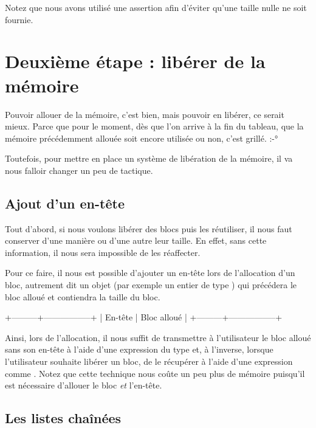 Notez que nous avons utilisé une assertion afin d'éviter qu'une taille
nulle ne soit fournie.

\section{Deuxième étape : libérer de la mémoire}
\label{deuxieme-etape-:-liberer-de-la-memoire}

Pouvoir allouer de la mémoire, c'est bien, mais pouvoir en
libérer, ce serait mieux. Parce que pour le moment, dès que l'on arrive
à la fin du tableau, que la mémoire précédemment allouée soit encore
utilisée ou non, c'est grillé. :-°

Toutefois, pour mettre en place un système de libération de la mémoire,
il va nous falloir changer un peu de tactique.

\subsection{Ajout d'un en-tête}
\label{ajout-dun-en-tete}

Tout d'abord, si nous voulons libérer des blocs puis les réutiliser, il
nous faut conserver d'une manière ou d'une autre leur taille. En effet,
sans cette information, il nous sera impossible de les réaffecter.

Pour ce faire, il nous est possible d'ajouter un en-tête lors de
l'allocation d'un bloc, autrement dit un objet (par exemple un entier de
type ) qui précédera le bloc alloué et contiendra la
taille du bloc.

\begin{C}
+---------+-----------------+
| En-tête |   Bloc alloué   |
+---------+-----------------+
\end{C}

Ainsi, lors de l'allocation, il nous suffit de transmettre à
l'utilisateur le bloc alloué sans son en-tête à l'aide d'une expression
du type  et, à l'inverse,
lorsque l'utilisateur souhaite libérer un bloc, de le récupérer à l'aide
d'une expression comme .
Notez que cette technique nous coûte un peu plus de mémoire puisqu'il
est nécessaire d'allouer le bloc \emph{et} l'en-tête.

\subsection{Les listes chaînées}
\label{les-listes-chainees}

